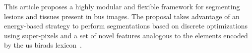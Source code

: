 %

This article proposes a highly modular and flexible framework for segmenting lesions and tissues present in \ac{bus} images.
The proposal takes advantage of an energy-based strategy to perform segmentations based on discrete optimizations using super-pixels and a set of novel features analogous to the elements encoded by the \ac{us} \ac{birads} lexicon~\cite{biradsus}.

